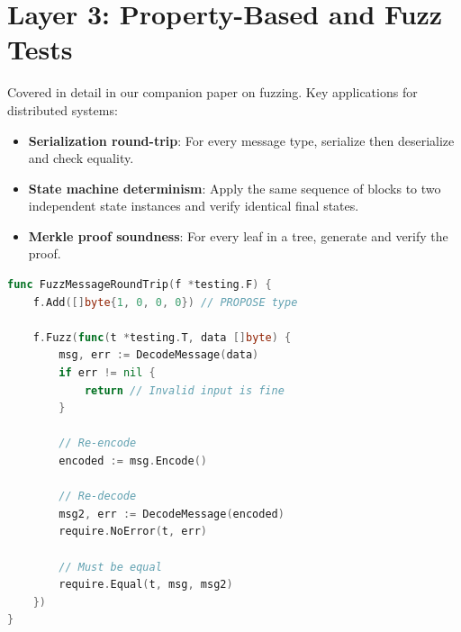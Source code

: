 \section{Layer 3: Property-Based and Fuzz Tests}


Covered in detail in our companion paper on fuzzing. Key applications for distributed
systems:

\begin{itemize}[nosep]
  \item \textbf{Serialization round-trip}: For every message type, serialize then
    deserialize and check equality.
  \item \textbf{State machine determinism}: Apply the same sequence of blocks to two
    independent state instances and verify identical final states.
  \item \textbf{Merkle proof soundness}: For every leaf in a tree, generate and verify
    the proof.
\end{itemize}

\begin{lstlisting}[language=Go,caption={Fuzz test for message serialization}]
func FuzzMessageRoundTrip(f *testing.F) {
    f.Add([]byte{1, 0, 0, 0}) // PROPOSE type

    f.Fuzz(func(t *testing.T, data []byte) {
        msg, err := DecodeMessage(data)
        if err != nil {
            return // Invalid input is fine
        }

        // Re-encode
        encoded := msg.Encode()

        // Re-decode
        msg2, err := DecodeMessage(encoded)
        require.NoError(t, err)

        // Must be equal
        require.Equal(t, msg, msg2)
    })
}
\end{lstlisting}

